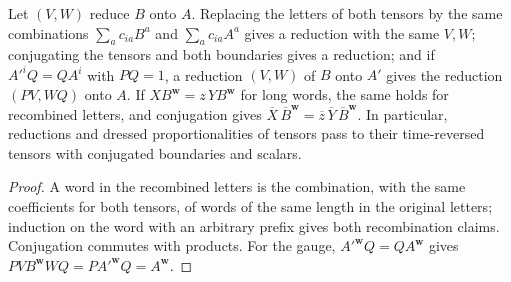 \begin{lemma}
    \label{lem:mpug_reduction_recombination}
    \leanok
    Let $(V,W)$ reduce $B$ onto $A$. Replacing the letters of both tensors by
    the same combinations $\sum_ac_{ia}B^a$ and $\sum_ac_{ia}A^a$ gives a
    reduction with the same $V,W$; conjugating the tensors and both
    boundaries gives a reduction; and if $A'^iQ=QA^i$ with $PQ=1$, a
    reduction $(V,W)$ of $B$ onto $A'$ gives the reduction $(PV,WQ)$ onto $A$.
    If $XB^{\mathbf w}=z\,YB^{\mathbf w}$ for long words, the same holds for
    recombined letters, and conjugation gives
    $\overline X\,\overline B^{\mathbf w}=\overline z\,\overline Y\,\overline B^{\mathbf w}$.
    In particular, reductions and dressed proportionalities of tensors pass
    to their time-reversed tensors with conjugated boundaries and scalars.
\end{lemma}

\begin{proof}
    \leanok
    A word in the recombined letters is the combination, with the same
    coefficients for both tensors, of words of the same length in the
    original letters; induction on the word with an arbitrary prefix gives
    both recombination claims. Conjugation commutes with products. For the
    gauge, $A'^{\mathbf w}Q=QA^{\mathbf w}$ gives
    $PVB^{\mathbf w}WQ=PA'^{\mathbf w}Q=A^{\mathbf w}$.
\end{proof}

